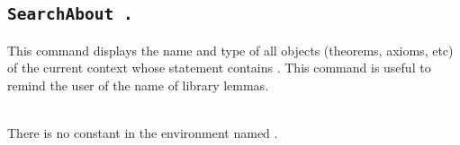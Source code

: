\subsection[\tt SearchAbout {\qualid}.]{\tt SearchAbout {\qualid}.}
This command displays the name and type of all objects (theorems,
axioms, etc) of the current context whose statement contains \qualid.
This command is useful to remind the user of the name of library
lemmas.

\begin{ErrMsgs}
\item {}\\
    There is no constant in the environment named \qualid.
\end{ErrMsgs}

\newcommand{\termpatternorstr}{{\termpattern}\textrm{\textsl{-}}{\str}}

